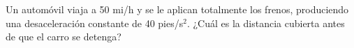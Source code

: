 \item Un automóvil viaja a 50 mi/h y se le aplican totalmente los frenos, produciendo una desaceleración constante de 40 pies/s$^2$. ¿Cuál es la distancia cubierta antes de que el carro se detenga?
